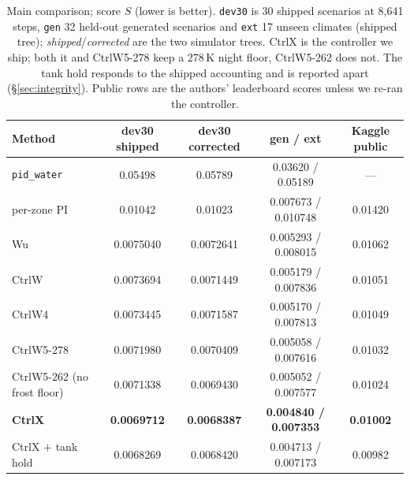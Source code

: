 \documentclass{article}
\newcommand{\cn}[1]{\texttt{#1}}
\begin{document}
\begin{table}[t]
\centering
\caption{Main comparison; score $S$ (lower is better). \cn{dev30} is 30 shipped scenarios at
8{,}641 steps, \cn{gen} 32 held-out generated scenarios and \cn{ext} 17 unseen climates (shipped tree);
\emph{shipped}/\emph{corrected} are the two simulator trees. CtrlX is the controller we ship; both it and
CtrlW5-278 keep a 278\,K night floor, CtrlW5-262 does not. The tank hold responds to the
shipped accounting and is reported apart (\S\ref{sec:integrity}). Public rows are the authors'
leaderboard scores unless we re-ran the controller.}
\label{tab:main}
\small
\setlength{\tabcolsep}{2pt}
\begin{tabular}{@{}lcccc@{}}
\toprule
Method & dev30 shipped & dev30 corrected & gen / ext & Kaggle public \\
\midrule
\cn{pid\_water} & 0.05498 & 0.05789 & 0.03620 / 0.05189 & --- \\
per-zone PI \citep{malyshev2026ztbest} & 0.01042 & 0.01023 & 0.007673 / 0.010748 & 0.01420 \\
Wu \citep{wu2026alpha075} & 0.0075040 & 0.0072641 & 0.005293 / 0.008015 & 0.01062 \\
CtrlW & 0.0073694 & 0.0071449 & 0.005179 / 0.007836 & 0.01051 \\
CtrlW4 & 0.0073445 & 0.0071587 & 0.005170 / 0.007813 & 0.01049 \\
CtrlW5-278 & 0.0071980 & 0.0070409 & 0.005058 / 0.007616 & 0.01032 \\
CtrlW5-262 (no frost floor) & 0.0071338 & 0.0069430 & 0.005052 / 0.007577 & 0.01024 \\
\textbf{CtrlX} & \textbf{0.0069712} & \textbf{0.0068387} & \textbf{0.004840 / 0.007353} & \textbf{0.01002} \\
\midrule
CtrlX $+$ tank hold & 0.0068269 & 0.0068420 & 0.004713 / 0.007173 & 0.00982 \\
\bottomrule
\end{tabular}
\end{table}
\end{document}
